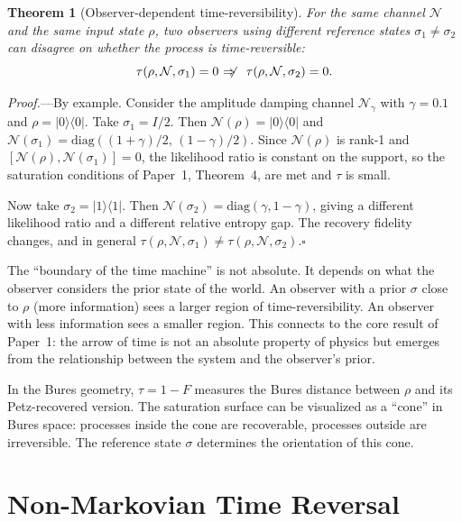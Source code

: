 \documentclass[prl,twocolumn,superscriptaddress,longbibliography,floatfix]{revtex4-2}
\newtheorem{theorem}{Theorem}
\newcommand{\chan}{\mathcal{N}}
\newcommand{\ket}[1]{|#1\rangle}
\newcommand{\bra}[1]{\langle#1|}
\newcommand{\tauasym}{\tau}
\begin{document}
\begin{theorem}[Observer-dependent time-reversibility]
\label{thm:observer}
For the same channel $\chan$ and the same input state $\rho$, two
observers using different reference states $\sigma_1 \neq \sigma_2$
can disagree on whether the process is time-reversible:
\begin{equation}
\tauasym(\rho, \chan, \sigma_1) = 0
\;\;\not\!\!\!\Rightarrow\;\;
\tauasym(\rho, \chan, \sigma_2) = 0.
\label{eq:observer}
\end{equation}
\end{theorem}

\emph{Proof.}---By example.  Consider the amplitude damping channel
$\chan_\gamma$ with $\gamma = 0.1$ and $\rho = \ket{0}\!\bra{0}$.
Take $\sigma_1 = I/2$.  Then
$\chan(\rho) = \ket{0}\!\bra{0}$ and
$\chan(\sigma_1) = \mathrm{diag}((1+\gamma)/2,\,(1-\gamma)/2)$.
Since $\chan(\rho)$ is rank-1 and $[\chan(\rho), \chan(\sigma_1)] = 0$,
the likelihood ratio is constant on the support, so the saturation
conditions of Paper~1, Theorem~4, are met and $\tauasym$ is small.

Now take $\sigma_2 = \ket{1}\!\bra{1}$.  Then
$\chan(\sigma_2) = \mathrm{diag}(\gamma, 1-\gamma)$, giving a
different likelihood ratio and a different relative entropy gap.  The
recovery fidelity changes, and in general
$\tauasym(\rho, \chan, \sigma_1) \neq
\tauasym(\rho, \chan, \sigma_2)$.\hfill$\square$

The ``boundary of the time machine'' is not absolute.  It depends on
what the observer considers the prior state of the world.  An observer
with a prior $\sigma$ close to $\rho$ (more information) sees a
larger region of time-reversibility.  An observer with less
information sees a smaller region.  This connects to the core result
of Paper~1: the arrow of time is not an absolute property of physics
but emerges from the relationship between the system and the
observer's prior.

In the Bures geometry, $\tauasym = 1 - F$ measures the Bures
distance between $\rho$ and its Petz-recovered version.  The
saturation surface can be visualized as a ``cone'' in Bures space:
processes inside the cone are recoverable, processes outside are
irreversible.  The reference state $\sigma$ determines the orientation
of this cone.

\section{Non-Markovian Time Reversal}
\label{sec:nonmarkov}
\end{document}
